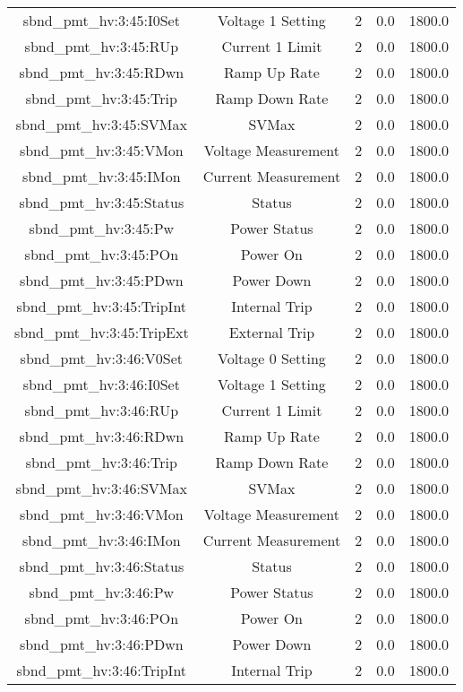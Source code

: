 \begin{table}[ptb]
\begin{tabular}{c | c c c c}
sbnd_pmt_hv:3:45:I0Set & Voltage 1 Setting & 2 & 0.0 & 1800.0\\ 
sbnd_pmt_hv:3:45:RUp & Current 1 Limit & 2 & 0.0 & 1800.0\\ 
sbnd_pmt_hv:3:45:RDwn & Ramp Up Rate & 2 & 0.0 & 1800.0\\ 
sbnd_pmt_hv:3:45:Trip & Ramp Down Rate & 2 & 0.0 & 1800.0\\ 
sbnd_pmt_hv:3:45:SVMax & SVMax & 2 & 0.0 & 1800.0\\ 
sbnd_pmt_hv:3:45:VMon & Voltage Measurement & 2 & 0.0 & 1800.0\\ 
sbnd_pmt_hv:3:45:IMon & Current Measurement & 2 & 0.0 & 1800.0\\ 
sbnd_pmt_hv:3:45:Status & Status & 2 & 0.0 & 1800.0\\ 
sbnd_pmt_hv:3:45:Pw & Power Status & 2 & 0.0 & 1800.0\\ 
sbnd_pmt_hv:3:45:POn & Power On & 2 & 0.0 & 1800.0\\ 
sbnd_pmt_hv:3:45:PDwn & Power Down & 2 & 0.0 & 1800.0\\ 
sbnd_pmt_hv:3:45:TripInt & Internal Trip & 2 & 0.0 & 1800.0\\ 
sbnd_pmt_hv:3:45:TripExt & External Trip & 2 & 0.0 & 1800.0\\ 
sbnd_pmt_hv:3:46:V0Set & Voltage 0 Setting & 2 & 0.0 & 1800.0\\ 
sbnd_pmt_hv:3:46:I0Set & Voltage 1 Setting & 2 & 0.0 & 1800.0\\ 
sbnd_pmt_hv:3:46:RUp & Current 1 Limit & 2 & 0.0 & 1800.0\\ 
sbnd_pmt_hv:3:46:RDwn & Ramp Up Rate & 2 & 0.0 & 1800.0\\ 
sbnd_pmt_hv:3:46:Trip & Ramp Down Rate & 2 & 0.0 & 1800.0\\ 
sbnd_pmt_hv:3:46:SVMax & SVMax & 2 & 0.0 & 1800.0\\ 
sbnd_pmt_hv:3:46:VMon & Voltage Measurement & 2 & 0.0 & 1800.0\\ 
sbnd_pmt_hv:3:46:IMon & Current Measurement & 2 & 0.0 & 1800.0\\ 
sbnd_pmt_hv:3:46:Status & Status & 2 & 0.0 & 1800.0\\ 
sbnd_pmt_hv:3:46:Pw & Power Status & 2 & 0.0 & 1800.0\\ 
sbnd_pmt_hv:3:46:POn & Power On & 2 & 0.0 & 1800.0\\ 
sbnd_pmt_hv:3:46:PDwn & Power Down & 2 & 0.0 & 1800.0\\ 
sbnd_pmt_hv:3:46:TripInt & Internal Trip & 2 & 0.0 & 1800.0\\ 

\end{tabular}
\end{table}

